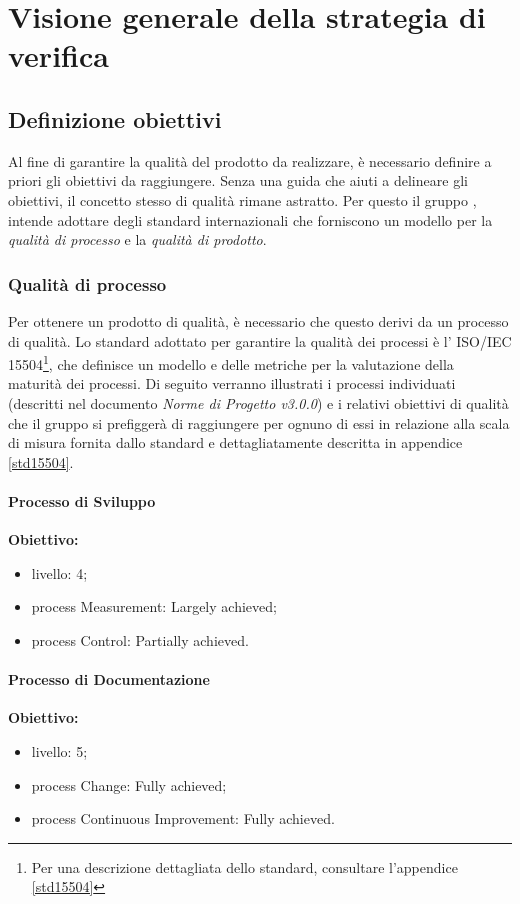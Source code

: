 


\section{Visione generale della strategia di verifica}
\label{visione}

\subsection{Definizione obiettivi}
Al fine di garantire la qualità del prodotto da realizzare, è necessario definire a priori gli obiettivi da raggiungere. Senza una guida che aiuti a delineare gli obiettivi, il concetto stesso di qualità rimane astratto. Per questo il gruppo \authorName{}, intende adottare degli standard internazionali che forniscono un modello per la \textit{qualità di processo} e la \textit{qualità di prodotto}.

\subsubsection{Qualità di processo}
Per ottenere un prodotto di qualità, è necessario che questo derivi da un processo di qualità. Lo standard adottato per garantire la qualità dei processi è l' ISO\glossario{}/IEC\glossario{} 15504\footnote{Per una descrizione dettagliata dello standard, consultare l'appendice \ref{std15504}}, che definisce un modello e delle metriche per la valutazione della maturità dei processi.
Di seguito verranno illustrati i processi individuati (descritti nel documento \emph{Norme di Progetto v3.0.0}) e i relativi obiettivi di qualità che il gruppo \authorName{} si prefiggerà di raggiungere per ognuno di essi in relazione alla scala di misura fornita dallo standard e dettagliatamente descritta in appendice \ref{std15504}.
\paragraph{Processo di Sviluppo\\}
\textbf{Obiettivo:}
	\begin{itemize}
	\item livello: 4;
	\item process Measurement: Largely achieved;
	\item process Control: Partially achieved.
\end{itemize}	 
\paragraph{Processo di Documentazione\\}
\textbf{Obiettivo:}
	\begin{itemize}
	\item livello: 5;
	\item process Change: Fully achieved;
	\item process Continuous Improvement: Fully achieved.
\end{itemize}

